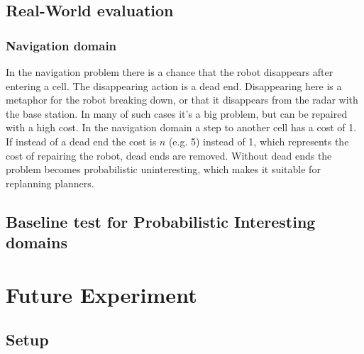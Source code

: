 \documentclass[runningheads,a4paper]{llncs}
\begin{document}
%
%

\subsection{Real-World evaluation}

\subsubsection{Navigation domain}

In the navigation problem there is a chance that the robot disappears after
entering a cell. The disappearing action is a dead end. Disappearing here is a
metaphor for the robot breaking down, or that it disappears from the radar with
the base station. In many of such cases it's a big problem, but can be repaired
with a high cost. In the navigation domain a step to another cell has a cost of
1. If instead of a dead end the cost is $n$ (e.g. 5) instead of 1, which
represents the cost of repairing the robot, dead ends are removed. Without dead
ends the problem becomes probabilistic uninteresting, which makes it suitable for
replanning planners.

\subsection{Baseline test for Probabilistic Interesting domains}


\section{Future Experiment}

\subsection{Setup}
\end{document}
